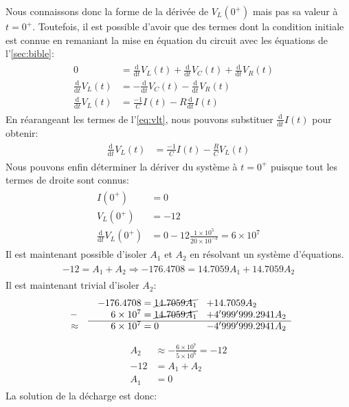 \documentclass[a11paper, 11pt]{article}
\newcommand{\ddt}[1]{\frac{\text{d}^{#1}}{\text{d}t^{#1}}}
\newcommand{\vlt}{V_L(t)}
\newcommand{\vlz}{V_L(0^+)}
\renewcommand{\exp}[1]{\times10^{#1}}
\begin{document}
\begin{appendix}
	Nous connaissons donc la forme de la dérivée de $\vlz$ mais pas sa valeur à
	$t=0^+$. Toutefois, il est possible d'avoir que des termes dont la condition
	initiale est connue en remaniant la mise en équation du circuit avec les
	équations de l'\cref{sec:bible}:
	\begin{gather*}
		\begin{align}
			0          & = \ddt{}\vlt + \ddt{}V_C(t) + \ddt{}V_R(t)\quad \\
			\ddt{}\vlt & =  - \ddt{}V_C(t) - \ddt{}V_R(t)                \\
			\ddt{}\vlt & = \frac{-1}{C}I(t) - R\ddt{}I(t)
		\end{align}
	\end{gather*}
	En réarangeant les termes de l'\cref{eq:vlt}, nous pouvons substituer $\ddt{}I(t)$ pour obtenir:
	\begin{gather*}
		\begin{align}
			\ddt{}\vlt & = \frac{-1}{C}I(t) - \frac{R}{C}\vlt
		\end{align}
	\end{gather*}
	Nous pouvons enfin déterminer la dériver du système à $t=0^+$ puisque tout les termes de droite sont connus:
	\begin{gather*}
		\begin{align}
			I(0^+)     & = 0                                              \\
			\vlz       & = -12                                            \\
			\ddt{}\vlz & =  0  - 12\frac{1\exp{5}}{20\exp{-3}} = 6\exp{7}
		\end{align}
	\end{gather*}
	Il est maintenant possible d'isoler $A_1$ et $A_2$ en résolvant un système d'équations.
	\begin{gather*}
		\begin{align}
			-12 = A_1 + A_2 \Rightarrow -176.4708 = 14.7059A_1 + 14.7059A_2
		\end{align}
	\end{gather*}
	Il est maintenant trivial d'isoler $A_2$:
	\begin{gather*}
		\begin{array}{l@{\quad}cr@{}ll}
			                   &  & -176.4708 & {}=        \cancel{14.7059A_1} & + 14.7059A_2         \\
			\text{\bfseries--} &  & 6\exp{7}  & {}= \cancel{14.7059 A_1}       & + 4'999'999.2941 A_2 \\ \cline{2-5}
			\approx            &  & 6\exp{7}  & {}= 0                          & -4'999'999.2941 A_2
		\end{array}
	\end{gather*}
	\begin{gather*}
		\begin{align}
			A_2 & \approx -\frac{6\exp{7}}{5\exp{6}} = -12 \\
			-12 & = A_1 + A_2                              \\
			A_1 & = 0
		\end{align}
	\end{gather*}
	La solution de la décharge est donc:


\end{appendix}
\end{document}
